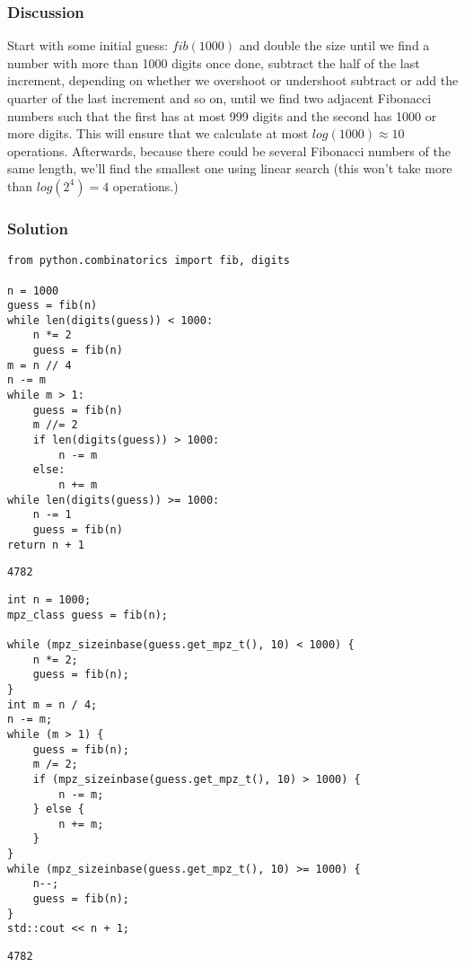 \documentclass[11pt]{article}
\begin{document}
\subsubsection{Discussion}
\label{sec:orgheadline3}
Start with some initial guess: \(fib(1000)\) and double the size until we find
a number with more than 1000 digits once done, subtract the half of the last
increment, depending on whether we overshoot or undershoot subtract or add
the quarter of the last increment and so on, until we find two adjacent
Fibonacci numbers such that the first has at most 999 digits and the second
has 1000 or more digits.  This will ensure that we calculate at most
\(log(1000) \approx 10\) operations.  Afterwards, because there could be
several Fibonacci numbers of the same length, we'll find the smallest one
using linear search (this won't take more than \(log(2^4) = 4\) operations.)

\subsubsection{Solution}
\label{sec:orgheadline4}

\begin{verbatim}
from python.combinatorics import fib, digits

n = 1000
guess = fib(n)
while len(digits(guess)) < 1000:
    n *= 2
    guess = fib(n)
m = n // 4
n -= m
while m > 1:
    guess = fib(n)
    m //= 2
    if len(digits(guess)) > 1000:
        n -= m
    else:
        n += m
while len(digits(guess)) >= 1000:
    n -= 1
    guess = fib(n)
return n + 1
\end{verbatim}

\begin{verbatim}
4782
\end{verbatim}

\begin{verbatim}
int n = 1000;
mpz_class guess = fib(n);

while (mpz_sizeinbase(guess.get_mpz_t(), 10) < 1000) {
    n *= 2;
    guess = fib(n);
}
int m = n / 4;
n -= m;
while (m > 1) {
    guess = fib(n);
    m /= 2;
    if (mpz_sizeinbase(guess.get_mpz_t(), 10) > 1000) {
        n -= m;
    } else {
        n += m;
    }
}
while (mpz_sizeinbase(guess.get_mpz_t(), 10) >= 1000) {
    n--;
    guess = fib(n);
}
std::cout << n + 1;
\end{verbatim}

\begin{verbatim}
4782
\end{verbatim}
\end{document}
